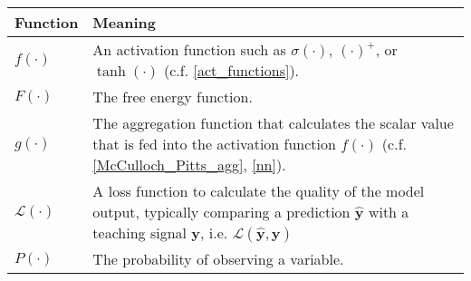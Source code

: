 \begin{tabular}{ p{3cm} p{11cm} }
	\textbf{Function} & \textbf{Meaning}\\
	\hline
	$f(\cdot)$ & An activation function such as $\sigma(\cdot)$, $(\cdot)^{+}$, or $\tanh(\cdot)$ (c.f. \eqref{act_functions}).\\
    $F(\cdot)$ & The free energy function.\\
	$g(\cdot)$ & The aggregation function that calculates the scalar value that is fed into the activation function $f(\cdot)$ (c.f. \eqref{McCulloch_Pitts_agg},  \eqref{nn}).\\
    $\mathcal{L}(\cdot)$ & A loss function to calculate the quality of the model output, typically comparing a prediction $\boldsymbol{\hat{y}}$ with a teaching signal $\boldsymbol{y}$, i.e. $\mathcal{L}(\boldsymbol{\hat{y}}, \boldsymbol{y})$\\
    $P(\cdot)$ & The probability of observing a variable.\\
\end{tabular}
\renewcommand{\arraystretch}{1}






